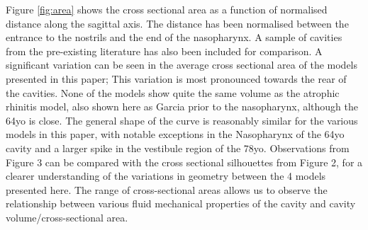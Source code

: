 Figure \ref{fig:area} shows the cross sectional area as a function of normalised distance along the sagittal axis. The distance has been normalised between the entrance to the nostrils and the end of the nasopharynx. A sample of cavities from the pre-existing literature has also been included for comparison. A significant variation can be seen in the average cross sectional area of the models presented in this paper; This variation is most pronounced towards the rear of the cavities. None of the models show quite the same volume as the atrophic rhinitis model, also shown here as Garcia prior to the nasopharynx, although the 64yo is close. The general shape of the curve is reasonably similar for the various models in this paper, with notable exceptions in the Nasopharynx of the 64yo cavity and a larger spike in the vestibule region of the 78yo. Observations from Figure 3 can be compared with the cross sectional silhouettes from Figure 2, for a clearer understanding of the variations in geometry between the 4 models presented here. The range of cross-sectional areas allows us to observe the relationship between various fluid mechanical properties of the cavity and cavity volume/cross-sectional area.

